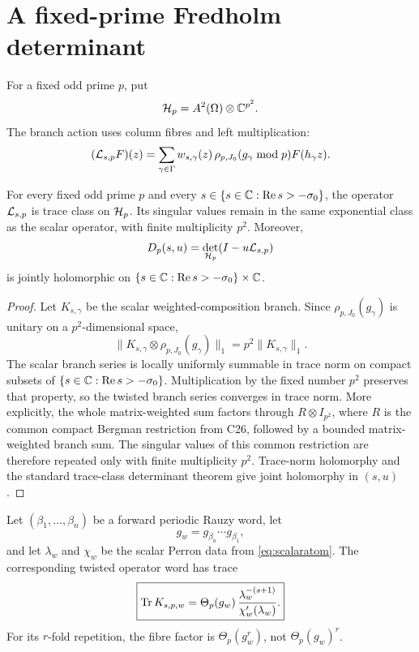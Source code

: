\section{A fixed-prime Fredholm determinant}
\label{sec:fredholm}

For a fixed odd prime \(p\), put
\[
\mathcal{H}_p=A^2(\Omega)\otimes\mathbb{C}^{p^2}.
\]
The branch action uses column fibres and left multiplication:
\begin{equation}
(\mathcal{L}_{s,p}F)(z)
=\sum_{\gamma\in\Gamma}
w_{s,\gamma}(z)\,
\rho_{p,J_0}(g_\gamma\bmod p)F(h_\gamma z).
\label{eq:twisted-operator}
\end{equation}

\begin{theorem}
\label{thm:fredholm}
For every fixed odd prime \(p\) and every \(s\in\{s\in\mathbb{C}:\operatorname{Re}s>-\sigma_0\}\), the operator
\(\mathcal{L}_{s,p}\) is trace class on \(\mathcal{H}_p\).  Its singular values remain in the
same exponential class as the scalar operator, with finite multiplicity
\(p^2\).  Moreover,
\[
D_p(s,u)=\det_{\mathcal{H}_p}(I-u\mathcal{L}_{s,p})
\]
is jointly holomorphic on \(\{s\in\mathbb{C}:\operatorname{Re}s>-\sigma_0\}\times\mathbb{C}\).
\end{theorem}

\begin{proof}
Let \(K_{s,\gamma}\) be the scalar weighted-composition branch.  Since
\(\rho_{p,J_0}(g_\gamma)\) is unitary on a \(p^2\)-dimensional space,
\[
\|K_{s,\gamma}\otimes\rho_{p,J_0}(g_\gamma)\|_1
=p^2\|K_{s,\gamma}\|_1.
\]
The scalar branch series is locally uniformly summable in trace norm on
compact subsets of \(\{s\in\mathbb{C}:\operatorname{Re}s>-\sigma_0\}\).  Multiplication by the fixed number
\(p^2\) preserves that property, so the twisted branch series converges in
trace norm.  More explicitly, the whole matrix-weighted sum factors through
\(R\otimes I_{p^2}\), where \(R\) is the common compact Bergman restriction
from C26, followed by a bounded matrix-weighted branch sum.  The singular
values of this common restriction are therefore repeated only with finite
multiplicity \(p^2\).  Trace-norm holomorphy and the standard trace-class
determinant theorem give joint holomorphy in \((s,u)\).
\end{proof}

\begin{theorem}
\label{thm:wordatom}
Let \((\beta_1,\ldots,\beta_n)\) be a forward periodic Rauzy word, let
\[
g_w=g_{\beta_n}\cdots g_{\beta_1},
\]
and let \(\lambda_w\) and \(\chi_w\) be the scalar Perron data from
\cref{eq:scalaratom}.  The corresponding twisted operator word has trace
\[
\boxed{
\operatorname{Tr} K_{s,p,w}
=\Theta_p(g_w)\,
\frac{\lambda_w^{-(s+1)}}{\chi_w'(\lambda_w)}.}
\]
For its \(r\)-fold repetition, the fibre factor is
\(\Theta_p(g_w^r)\), not \(\Theta_p(g_w)^r\).
\end{theorem}

